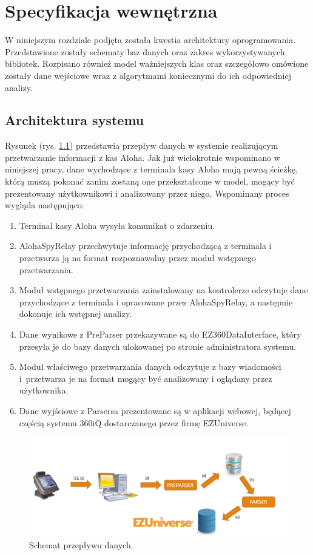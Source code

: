 \documentclass[a4paper]{book}
\begin{document}
\chapter{Specyfikacja wewnętrzna}
\label{rozdzial5}
W niniejszym rozdziale podjęta została kwestia architektury oprogramowania. Przedstawione zostały schematy baz danych oraz zakres wykorzystywanych bibliotek. Rozpisano również model ważniejszych klas oraz szczegółowo omówione zostały dane wejściowe wraz z algorytmami koniecznymi do ich odpowiedniej analizy.
\section{Architektura systemu}
Rysunek (rys. \ref{fig:schemat_przeplywu_danych}) przedstawia przepływ danych w systemie realizującym przetwarzanie informacji z kas Aloha.
Jak już wielokrotnie wspominano w niniejszej pracy, dane wychodzące z terminala kasy Aloha mają pewną ścieżkę, którą muszą pokonać zanim zostaną one przekształcone w model, mogący być prezentowany użytkownikowi i analizowany przez niego. Wspominany proces wygląda następująco:
 \begin{enumerate}
	\item Terminal kasy Aloha wysyła komunikat o zdarzeniu.
	\item AlohaSpyRelay przechwytuje informację przychodzącą z terminala i przetwarza ją na format rozpoznawalny przez moduł wstępnego przetwarzania.
	\item Moduł wstępnego przetwarzania zainstalowany na kontrolerze odczytuje dane przychodzące z terminala i opracowane przez AlohaSpyRelay, a następnie dokonuje ich wstępnej analizy.
	\item Dane wynikowe z PreParser przekazywane są do EZ360DataInterface, który przesyła je do bazy danych ulokowanej po stronie administratora systemu.
	\item Moduł właściwego przetwarzania danych odczytuje z bazy wiadomości i~przetwarza je na format mogący być analizowany i oglądany przez użytkownika.
	\item Dane wyjściowe z Parsersa prezentowane są w aplikacji webowej, będącej częścią systemu 360iQ dostarczanego przez firmę EZUniverse.
\end{enumerate}
\begin{figure}[t]
	\centering
	\includegraphics[width=\textheight]{./img/schemat_przeplywu_danych.png}
	\caption{Schemat przepływu danych.}
	\label{fig:schemat_przeplywu_danych}
\end{figure}
\end{document}
